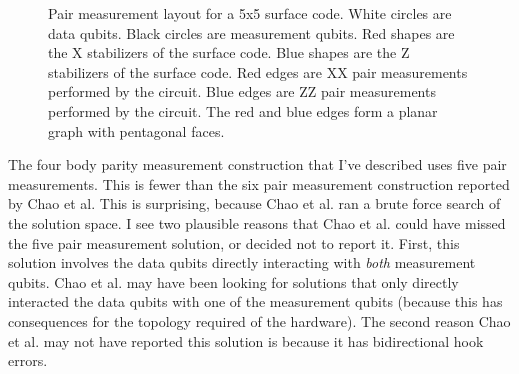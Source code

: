 \documentclass[onecolumn,unpublished,a4paper]{quantumarticle}
\theoremstyle{definition}
\theoremstyle{definition}
\theoremstyle{definition}
\begin{document}
\begin{figure}
    \centering
    \caption{
        Pair measurement layout for a 5x5 surface code.
        White circles are data qubits.
        Black circles are measurement qubits.
        Red shapes are the X stabilizers of the surface code.
        Blue shapes are the Z stabilizers of the surface code.
        Red edges are XX pair measurements performed by the circuit.
        Blue edges are ZZ pair measurements performed by the circuit.
        The red and blue edges form a planar graph with pentagonal faces.
    }
    \label{fig:tiling}
\end{figure}

The four body parity measurement construction that I've described uses five pair measurements.
This is fewer than the six pair measurement construction reported by Chao et al.
This is surprising, because Chao et al. ran a brute force search of the solution space.
I see two plausible reasons that Chao et al. could have missed the five pair measurement solution, or decided not to report it.
First, this solution involves the data qubits directly interacting with \emph{both} measurement qubits.
Chao et al. may have been looking for solutions that only directly interacted the data qubits with one of the measurement qubits (because this has consequences for the topology required of the hardware).
The second reason Chao et al. may not have reported this solution is because it has bidirectional hook errors.
\end{document}
